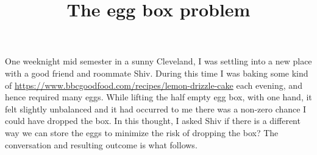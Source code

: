 \documentclass[11pt]{ekblite}
\begin{document}
\title{The egg box problem}
\maketitle

One weeknight mid semester in a sunny Cleveland, I was settling into a new place with a good friend and roommate Shiv.
During this time I was baking some kind of \href{lemon drizzle}{https://www.bbcgoodfood.com/recipes/lemon-drizzle-cake} each evening, and hence required many eggs.
While lifting the half empty egg box, with one hand, it felt slightly unbalanced and it had occurred to me there was a non-zero chance I could have dropped the box.
In this thought, I asked Shiv if there is a different way we can store the eggs to minimize the risk of dropping the box?
The conversation and resulting outcome is what follows.


\end{document}
